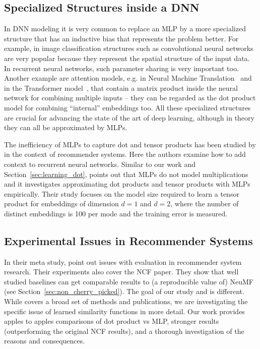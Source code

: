 \documentclass{article}
\begin{document}
\subsection{Specialized Structures inside a DNN}
\label{sec:related:dnn}

In DNN modeling it is very common to replace an MLP by a more specialized structure that has an inductive bias that represents the problem better.
For example, in image classification structures such as convolutional neural networks are very popular because they represent the spatial structure of the input data.
In recurrent neural networks, such parameter sharing is very important too.
Another example are attention models, e.g. in Neural Machine Translation~\cite{wu2016google} and in the Transformer model~\cite{vaswani2017attention}, that contain a matrix product inside the neural network for combining multiple inputs -- they can be regarded as the dot product model for combining ``internal'' embeddings too.
All these specialized structures are crucial for advancing the state of the art of deep learning, although in theory they can all be approximated by MLPs.

The inefficiency of MLPs to capture dot and tensor products has been studied by \cite{beutel:wsdm18} in the context of recommender systems.
Here the authors examine how to add context to recurrent neural networks.
Similar to our work and Section~\ref{sec:learning_dot}, \cite{beutel:wsdm18} points out that MLPs do not model multiplications and it investigates approximating dot products and tensor products with MLPs empirically.
Their study focuses on the model size required to learn a tensor product for embeddings of dimension $d=1$ and $d=2$, where the number of distinct embeddings is 100 per mode and the training error is measured.

\subsection{Experimental Issues in Recommender Systems}

In their meta study, \cite{dacrema:arxiv2019} point out issues with evaluation in recommender system research.
Their experiments also cover the NCF paper.
They show that well studied baselines can get comparable results to (a reproducible value of) NeuMF (see Section~\ref{sec:non_cherry_picked}).
The goal of our study and \cite{dacrema:arxiv2019} is different.
While \cite{dacrema:arxiv2019} covers a broad set of methods and publications, we are investigating the specific issue of learned similarity functions in more detail.
Our work provides apples to apples comparisons of dot product vs MLP, stronger results (outperforming the original NCF results), and a thorough investigation of the reasons and consequences.
\end{document}
